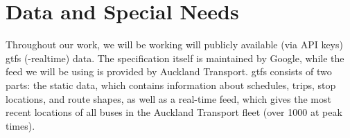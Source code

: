 \documentclass[12pt,a4paper]{article}
\begin{document}
\section{Data and Special Needs}
\label{sec:data}























Throughout our work, we will be working will publicly available (via API keys) \gls{gtfs}
(-realtime) data.
The specification itself is maintained by Google, 
while the feed we will be using is provided by Auckland Transport.
\gls{gtfs} consists of two parts:
the static data, which contains information about schedules, trips, stop locations,
and route shapes, as well as a real-time feed, which gives the most recent locations
of all buses in the Auckland Transport fleet (over 1000 at peak times).
\end{document}

